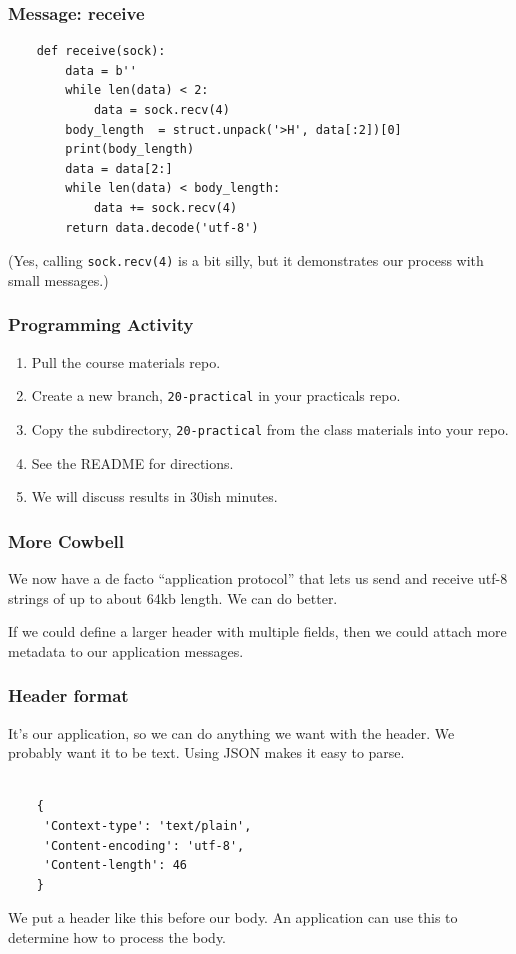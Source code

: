 \documentclass[10pt]{beamer}
\begin{document}
\begin{frame}[fragile]
  \frametitle{Message: receive}
  
  \begin{verbatim}
    def receive(sock):
        data = b''
        while len(data) < 2:
            data = sock.recv(4)
        body_length  = struct.unpack('>H', data[:2])[0]
        print(body_length)
        data = data[2:]
        while len(data) < body_length:
            data += sock.recv(4)
        return data.decode('utf-8')  \end{verbatim} 
   

(Yes, calling \texttt{sock.recv(4)} is a bit silly, but it demonstrates our process with
small messages.)
\end{frame}
\begin{frame}
  \frametitle{Programming Activity}
  
  \begin{enumerate}
    \item Pull the course materials repo.
    \item Create a new branch, \texttt{20-practical} in your practicals repo.
    \item Copy the subdirectory, \texttt{20-practical} from the class materials into your repo.
    \item See the README for directions.
    \item We will discuss results in 30ish minutes.
  \end{enumerate}      
\end{frame}
  
\begin{frame}
  \frametitle{More Cowbell}
  
  We now have a de facto ``application protocol'' that lets us send and 
  receive utf-8 strings of up to about 64kb length.  We can do better.
  
  \vspace{5mm}
  If we could define a larger header with multiple fields, then we could 
  attach more metadata to our application messages.
      
\end{frame}

\begin{frame}[fragile]
  \frametitle{Header format}
  
  It's our application, so we can do anything we want with the header. We
  probably want it to be text. Using JSON makes it easy to parse.
  \begin{verbatim}
  
    {
     'Context-type': 'text/plain',
     'Content-encoding': 'utf-8',
     'Content-length': 46
    }
  \end{verbatim}   
  
  We put a header like this before our body. An application can use this
  to determine how to process the body.
     
\end{frame}
\end{document}
